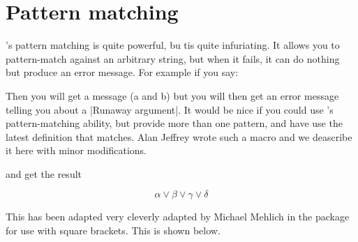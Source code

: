\chapter{Pattern matching}

\tex's pattern matching is quite powerful, bu tis quite infuriating. It allows you to pattern-match against an arbitrary string, but when it fails, it can do nothing but produce an error message. For example if you say:


\noindent Then you will get a message (a and b) but you will then get an error message telling you about a |Runaway argument|. It would be nice if you could use \tex's pattern-matching ability, but provide more than one pattern, and have \tex use the latest definition that matches. Alan Jeffrey wrote such a macro and we deascribe it here with minor modifications.


\noindent and get the result

$$\alpha\vee\beta\vee\gamma\vee\delta$$

This has been adapted very cleverly adapted by Michael Mehlich in the  package for use with square brackets. This is shown below.




